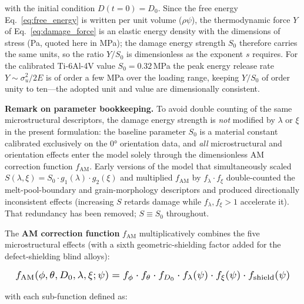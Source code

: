 \documentclass[twocolumn]{sagej}
\begin{document}
with the initial condition $D(t=0) = D_0$. Since the free energy Eq.~\eqref{eq:free_energy} is written per unit volume ($\rho\psi$), the thermodynamic force $Y$ of Eq.~\eqref{eq:damage_force} is an elastic energy density with the dimensions of stress (Pa, quoted here in MPa); the damage energy strength $S_0$ therefore carries the same units, so the ratio $Y/S_0$ is dimensionless as the exponent $s$ requires. For the calibrated Ti-6Al-4V value $S_0 = 0.32$\,MPa the peak energy release rate $Y \sim \sigma_u^2/2E$ is of order a few MPa over the loading range, keeping $Y/S_0$ of order unity to ten---the adopted unit and value are dimensionally consistent.

\textbf{Remark on parameter bookkeeping.} To avoid double counting of the same microstructural descriptors, the damage energy strength is \emph{not} modified by $\lambda$ or $\xi$ in the present formulation: the baseline parameter $S_0$ is a material constant calibrated exclusively on the $\ang{0}$ orientation data, and \emph{all} microstructural and orientation effects enter the model solely through the dimensionless AM correction function $f_{\text{AM}}$. Early versions of the model that simultaneously scaled $S(\lambda,\xi) = S_0 \cdot g_1(\lambda) \cdot g_2(\xi)$ and multiplied $f_{\text{AM}}$ by $f_\lambda \cdot f_\xi$ double-counted the melt-pool-boundary and grain-morphology descriptors and produced directionally inconsistent effects (increasing $S$ retards damage while $f_\lambda, f_\xi > 1$ accelerate it). That redundancy has been removed; $S \equiv S_0$ throughout.

The \textbf{AM correction function} $f_{\text{AM}}$ multiplicatively combines the five microstructural effects (with a sixth geometric-shielding factor added for the defect-shielding blind alloys):

\begin{equation}
\resizebox{0.97\columnwidth}{!}{$\displaystyle f_{\text{AM}}(\phi, \theta, D_0, \lambda, \xi; \psi) = f_\phi \cdot f_\theta \cdot f_{D_0} \cdot f_\lambda(\psi) \cdot f_\xi(\psi) \cdot f_{\text{shield}}(\psi)$}
\label{eq:f_AM}
\end{equation}

with each sub-function defined as:
\end{document}
